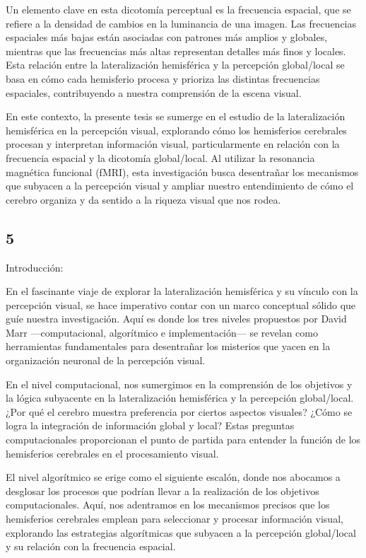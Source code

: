 \documentclass[12pt,oneside]{uhthesis}
\begin{document}
Un elemento clave en esta dicotomía perceptual es la frecuencia espacial, que se refiere a la densidad de cambios en la luminancia de una imagen. Las frecuencias espaciales más bajas están asociadas con patrones más amplios y globales, mientras que las frecuencias más altas representan detalles más finos y locales. Esta relación entre la lateralización hemisférica y la percepción global/local se basa en cómo cada hemisferio procesa y prioriza las distintas frecuencias espaciales, contribuyendo a nuestra comprensión de la escena visual.

En este contexto, la presente tesis se sumerge en el estudio de la lateralización hemisférica en la percepción visual, explorando cómo los hemisferios cerebrales procesan y interpretan información visual, particularmente en relación con la frecuencia espacial y la dicotomía global/local. Al utilizar la resonancia magnética funcional (fMRI), esta investigación busca desentrañar los mecanismos que subyacen a la percepción visual y ampliar nuestro entendimiento de cómo el cerebro organiza y da sentido a la riqueza visual que nos rodea.

\subsection{5}

Introducción:

En el fascinante viaje de explorar la lateralización hemisférica y su vínculo con la percepción visual, se hace imperativo contar con un marco conceptual sólido que guíe nuestra investigación. Aquí es donde los tres niveles propuestos por David Marr —computacional, algorítmico e implementación— se revelan como herramientas fundamentales para desentrañar los misterios que yacen en la organización neuronal de la percepción visual.

En el nivel computacional, nos sumergimos en la comprensión de los objetivos y la lógica subyacente en la lateralización hemisférica y la percepción global/local. ¿Por qué el cerebro muestra preferencia por ciertos aspectos visuales? ¿Cómo se logra la integración de información global y local? Estas preguntas computacionales proporcionan el punto de partida para entender la función de los hemisferios cerebrales en el procesamiento visual.

El nivel algorítmico se erige como el siguiente escalón, donde nos abocamos a desglosar los procesos que podrían llevar a la realización de los objetivos computacionales. Aquí, nos adentramos en los mecanismos precisos que los hemisferios cerebrales emplean para seleccionar y procesar información visual, explorando las estrategias algorítmicas que subyacen a la percepción global/local y su relación con la frecuencia espacial.
\end{document}
